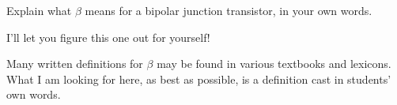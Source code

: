 

Explain what $\beta$ means for a bipolar junction transistor, in your own words.







I'll let you figure this one out for yourself!







Many written definitions for $\beta$ may be found in various textbooks and lexicons.  What I am looking for here, as best as possible, is a definition cast in students' own words.




